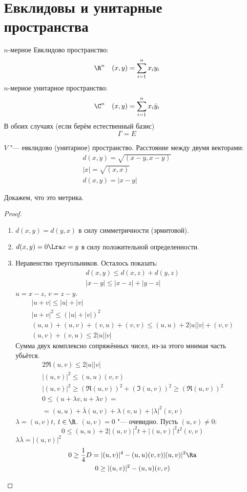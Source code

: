 \section{Евклидовы и унитарные пространства}

\begin{Def}
	$n$-мерное Евклидово пространство:
	\[ \R^n \quad (x, y) = \sum_{i=1}^n x_iy_i \]
	$n$-мерное унитарное пространство:
	\[ \C^n \quad (x, y) = \sum_{i=1}^n x_i \bar y_i \]
	В обоих случаях (если берём естественный базис)
	\[ \Gamma = E \]
\end{Def}

\begin{Def}
	$V$ "--- евклидово (унитарное) пространство.
	Расстояние между двумя векторами:
	\begin{gather*}
		d(x, y) = \sqrt{(x - y, x - y)} \\
		|x| = \sqrt{(x, x)} \\
		d(x, y) = |x - y|
	\end{gather*}
\end{Def}

Докажем, что это метрика.
\begin{proof}
	\begin{enumerate}
	\item
	$d(x, y) = d(y, x)$ в силу симметричности (эрмитовой). 
	\item
	$d(x, y) = 0 \Lra x = y$ в силу положительной определенности. 
	\item Неравенство треугольников.
	Осталось показать:
	\begin{gather*}
		d(x, y) \le d(x, z) + d(y, z) \\
		|x - y| \le |x - z| + |y - z|
	\end{gather*}
	$u = x - z$, $v = z - y$.
	\begin{gather*}
		|u + v| \le |u| + |v| \\
		|u + v|^2 \le (|u| + |v|)^2 \\
		(u, u) + (u, v) + (v, u) + (v, v) \le (u, u) + 2|u||v| + (v, v) \\
		(u, v) + (v, u) \le 2|u||v|
	\end{gather*}
	Сумма двух комплексно сопряжённых чисел, из-за этого мнимая часть убьётся.
	\begin{gather*}
		2\Re(u, v) \le 2|u||v| \\
		|(u, v)|^2 \le (u, u)(v, v) \\
		|(u, v)|^2 \ge (\Re(u, v))^2 + (\Im(u, v))^2 \ge (\Re(u,v))^2 \\
		0 \le (u + \lambda v, u + \lambda v) =  \\
		= (u, u) + \overline{\lambda}(u, v) + \lambda(v, u) + |\lambda|^2(v, v)
	\end{gather*}
	$\lambda = (u, v)t$, $t \in \R$.
	$(u, v) = 0$ "--- очевидно.
	Пусть $(u, v) \ne 0$:
	\[
		0 \le (u, u) + 2|(u, v)|^2t + |(u, v)|^2t^2(v, v)
	\]
	$\lambda\overline{\lambda} = |(u, v)|^2$
	\begin{gather*}
		0 \ge \frac{1}{4}D = |(u,v)|^4 - (u, u)(v, v)|(u, v)|^2 \Ra \\
		0 \ge |(u, v)|^2 - (u, u)(v, v)
	\end{gather*}
	\end{enumerate}
\end{proof}

